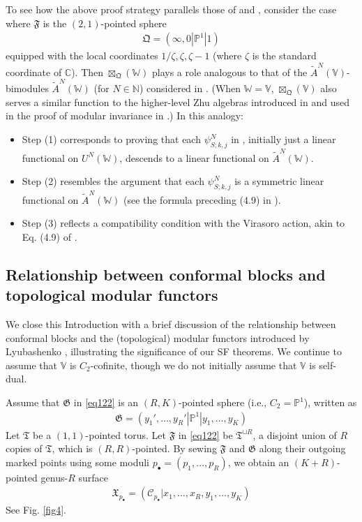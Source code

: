 \documentclass[11pt,b5paper,notitlepage]{article}
\theoremstyle{definition}
\theoremstyle{plain}
\newcommand{\fk}{\mathfrak}
\newcommand{\wtd}{\widetilde}
\newcommand{\blt}{\bullet}
\newcommand{\Vbb}{\mathbb V}
\newcommand{\Wbb}{\mathbb W}
\newcommand{\Cbb}{\mathbb C}
\newcommand{\Nbb}{\mathbb N}
\newcommand{\Pbb}{\mathbb P}
\newcommand{\<}{\left\langle}
\renewcommand{\>}{\right\rangle}
\newcommand{\MC}{\mathcal{C}}
\newcommand{\fx}{\mathfrak{X}}
\newcommand{\fq}{{\mathfrak Q}}
\newcommand{\ff}{\mathfrak{F}}
\newcommand{\fg}{\mathfrak{G}}
\numberwithin{equation}{section}
\begin{document}
To see how the above proof strategy parallels those of \cite{Miy-modular-invariance} and \cite{Hua-modular-C2}, consider the case where $\ff$ is the $(2,1)$-pointed sphere
\begin{align}
\fq=(\infty,0|\Pbb^1|1)
\end{align} 
equipped with the local coordinates $1/\zeta,\zeta,\zeta-1$ (where $\zeta$ is the standard coordinate of $\Cbb$). Then $\boxtimes_\fq(\Wbb)$ plays a role analogous to that of the $\wtd A^N(\Vbb)$-bimodules $\wtd A^N(\Wbb)$ (for $N\in\Nbb$) considered in \cite{Hua-associative,Hua22-Ass-IO,Hua-modular-C2}. (When $\Wbb=\Vbb$, $\boxtimes_\fq(\Vbb)$ also serves a similar function to the higher-level Zhu algebras introduced in \cite{DLM-Zhu} and used in the proof of modular invariance in \cite{Miy-modular-invariance}.) In this analogy: 
\begin{itemize}
\item Step (1) corresponds to proving that each \( \psi^N_{S;k,j} \) in \cite[Thm. 4.3]{Hua-modular-C2}, initially just a linear functional on \( U^N(\Wbb) \), descends to a linear functional on \( \wtd A^N(\Wbb) \). 
\item Step (2) resembles the argument that each \( \psi^N_{S;k,j} \) is a symmetric linear functional on $\wtd A^N(\Wbb)$ (see the formula preceding (4.9) in \cite[Thm. 4.3]{Hua-modular-C2}).
\item Step (3) reflects a compatibility condition with the Virasoro action, akin to Eq. (4.9) of \cite[Thm. 4.3]{Hua-modular-C2}.
\end{itemize}










\subsection{Relationship between conformal blocks and topological modular functors}


We close this Introduction with a brief discussion of the relationship between conformal blocks and the (topological) modular functors introduced by Lyubashenko \cite{Lyu96-Ribbon}, illustrating the significance of our SF theorems. We continue to assume that $\Vbb$ is $C_2$-cofinite, though we do not initially assume that $\Vbb$ is self-dual.



Assume that $\fg$ in \eqref{eq122} is an $(R,K)$-pointed sphere (i.e., $C_2=\Pbb^1$), written as
\begin{align*}
\fg=(y_1',\dots,y_R'|\Pbb^1|y_1,\dots,y_K)
\end{align*}
Let $\fk T$ be a $(1,1)$-pointed torus. Let $\ff$ in \eqref{eq122} be $\fk T^{\sqcup R}$, a disjoint union of $R$ copies of  $\fk T$, which is $(R,R)$-pointed. By sewing $\ff$ and $\fg$ along their outgoing marked points using some moduli $p_\blt=(p_1,\dots,p_R)$, we obtain an $(K+R)$-pointed genus-$R$ surface 
\begin{align*}
\fx_{p_\blt}=(\MC_{p_\blt}|x_1,\dots,x_R,y_1,\dots,y_K)
\end{align*}
See Fig. \ref{fig4}. 
\end{document}

